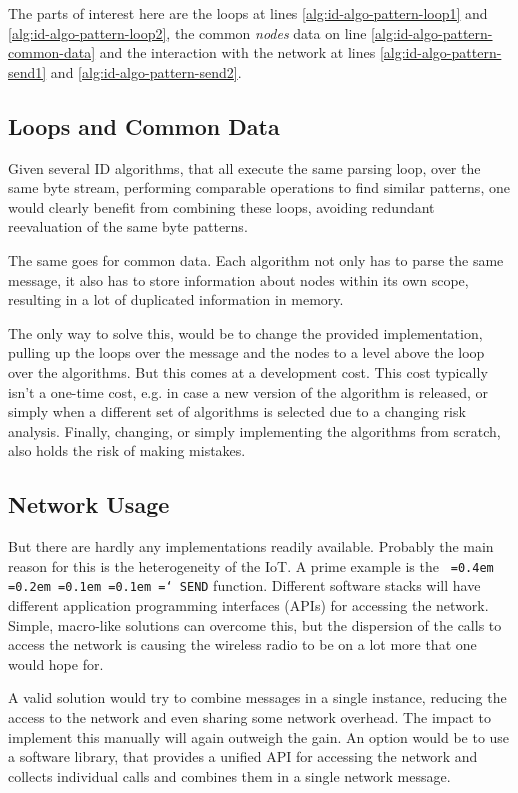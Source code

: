 \documentclass[conference]{IEEEtran}
\newcommand*\justify{%
  \fontdimen2\font=0.4em%
  \fontdimen3\font=0.2em%
  \fontdimen4\font=0.1em%
  \fontdimen7\font=0.1em%
  \hyphenchar\font=`\-%
}
\newcommand{\ttt}[1]{\texttt{\justify{#1}}}
\begin{document}
The parts of interest here are the loops at lines
\ref{alg:id-algo-pattern-loop1} and \ref{alg:id-algo-pattern-loop2}, the common
\emph{nodes} data on line \ref{alg:id-algo-pattern-common-data} and the
interaction with the network at lines \ref{alg:id-algo-pattern-send1} and
\ref{alg:id-algo-pattern-send2}.

\subsection{Loops and Common Data}

Given several ID algorithms, that all execute the same parsing loop, over the
same byte stream, performing comparable operations to find similar patterns,
one would clearly benefit from combining these loops, avoiding redundant
reevaluation of the same byte patterns.

The same goes for common data. Each algorithm not only has to parse the same
message, it also has to store information about nodes within its own scope,
resulting in a lot of duplicated information in memory.

The only way to solve this, would be to change the provided implementation,
pulling up the loops over the message and the nodes to a level above the loop
over the algorithms. But this comes at a development cost. This cost typically
isn't a one-time cost, e.g. in case a new version of the algorithm is released,
or simply when a different set of algorithms is selected due to a changing risk
analysis. Finally, changing, or simply implementing the algorithms from
scratch, also holds the risk of making mistakes.

\subsection{Network Usage}

But there are hardly any implementations readily available. Probably the main
reason for this is the heterogeneity of the IoT. A prime example is the
\ttt{SEND} function. Different software stacks will have different application
programming interfaces (APIs) for accessing the network. Simple, macro-like
solutions can overcome this, but the dispersion of the calls to access the
network is causing the wireless radio to be on a lot more that one would hope
for.

A valid solution would try to combine messages in a single instance, reducing
the access to the network and even sharing some network overhead. The impact to
implement this manually will again outweigh the gain. An option would be to use
a software library, that provides a unified API for accessing the network and
collects individual calls and combines them in a single network message.
\end{document}
